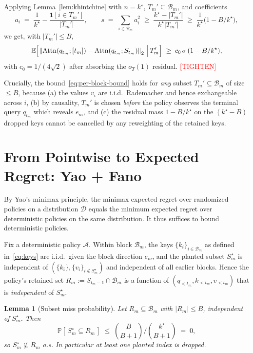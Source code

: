 \documentclass{article}
\newtheorem{lemma}[theorem]{Lemma}
\theoremstyle{definition}
\theoremstyle{remark}
\newcommand{\E}{\mathbb{E}}
\newcommand{\PR}{\mathbb{P}}
\newcommand{\A}{\mathcal{A}}
\newcommand{\D}{\mathcal{D}}
\newcommand{\Bset}{\mathcal{B}}
\newcommand{\Attn}{\mathrm{Attn}}
\newcommand{\norm}[1]{\left\lVert #1 \right\rVert}
\newcommand{\indicator}{\mathbf{1}}
\newcommand{\tighten}{\textcolor{red}{[TIGHTEN]}}
\begin{document}
Applying Lemma~\ref{lem:khintchine} with $n=k^\star$, $T_m'\subseteq\Bset_m$, and coefficients
\[
a_i \;=\; \frac{1}{k^\star}-\frac{\indicator[i\in T_m']}{|T_m'|}, \qquad s \;=\; \sum_{i\in\Bset_m}a_i^2 \;\ge\; \frac{k^\star-|T_m'|}{k^\star|T_m'|}\;\ge\;\frac{1}{k^\star}\bigl(1-B/k^\star\bigr),
\]
we get, with $|T_m'|\le B$,
\begin{equation}\label{eq:per-block-bound}
\E\Bigl[\norm{\Attn(q_{t_m};[t_m])-\Attn(q_{t_m};S_{t_m})}_2 \,\Big|\, T_m' \Bigr]
\;\ge\; c_0\,\sigma\,(1-B/k^\star),
\end{equation}
with $c_0=1/(4\sqrt 2)$ after absorbing the $o_T(1)$ residual. \tighten

Crucially, the bound~\eqref{eq:per-block-bound} holds for \emph{any} subset $T_m'\subseteq\Bset_m$ of size $\le B$, because (a) the values $v_i$ are i.i.d.\ Rademacher and hence exchangeable across $i$, (b) by causality, $T_m'$ is chosen \emph{before} the policy observes the terminal query $q_{t_m}$ which reveals $e_m$, and (c) the residual mass $1-B/k^\star$ on the $(k^\star-B)$ dropped keys cannot be cancelled by any reweighting of the retained keys.

\section{From Pointwise to Expected Regret: Yao + Fano}
\label{sec:fano}

By Yao's minimax principle, the minimax expected regret over randomized policies on a distribution $\D$ equals the minimum expected regret over deterministic policies on the same distribution. It thus suffices to bound deterministic policies.

Fix a deterministic policy $\A$. Within block $\Bset_m$, the keys $\{k_i\}_{i\in\Bset_m}$ as defined in~\eqref{eq:keys} are i.i.d.\ given the block direction $e_m$, and the planted subset $S_m^\star$ is independent of $(\{k_i\},\{v_i\}_{i\not\in S_m^\star})$ and independent of all earlier blocks. Hence the policy's retained set $R_m:=S_{t_m-1}\cap\Bset_m$ is a function of $(q_{<t_m},k_{<t_m},v_{<t_m})$ that is \emph{independent} of $S_m^\star$.

\begin{lemma}[Subset miss probability]\label{lem:miss}
Let $R_m\subseteq\Bset_m$ with $|R_m|\le B$, independent of $S_m^\star$. Then
\[
\PR[\,S_m^\star\subseteq R_m\,]\;\le\;\binom{B}{B+1}\Big/\binom{k^\star}{B+1}\;=\;0,
\]
so $S_m^\star\not\subseteq R_m$ a.s. In particular at least one planted index is dropped.
\end{lemma}
\end{document}
